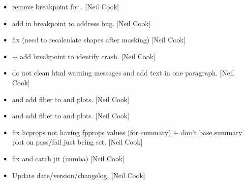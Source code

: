 \documentclass[a4paper,10pt,english]{report}
\begin{document}
\begin{itemize}
\item {} 
 \sphinxhyphen{} remove breakpoint for . {[}Neil Cook{]}

\item {} 
 \sphinxhyphen{} add in breakpoint to address bug. {[}Neil
Cook{]}

\item {} 
 \sphinxhyphen{} fix  (need to re\sphinxhyphen{}calculate
shapes after masking) {[}Neil Cook{]}

\item {} 
 +  \sphinxhyphen{}
add breakpoint to identify crash. {[}Neil Cook{]}

\item {} 
 \sphinxhyphen{} do not clean html warning messages and add text in
one paragraph. {[}Neil Cook{]}

\item {} 
 and  \sphinxhyphen{} add fiber to
 and  plots. {[}Neil Cook{]}

\item {} 
 and  \sphinxhyphen{} add fiber to
 and  plots. {[}Neil Cook{]}

\item {} 
 \sphinxhyphen{} fix hcprops not having fpprops values (for
summary) + don’t base summary plot on pass/fail just 
being set. {[}Neil Cook{]}

\item {} 
 \sphinxhyphen{} fix and catch jit (numba) {[}Neil Cook{]}

\item {} 
Update date/version/changelog. {[}Neil Cook{]}

\end{itemize}
\end{document}
